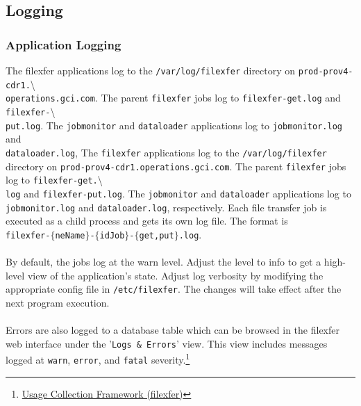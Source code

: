 \documentclass[12pt,letterpaper,dvips]{article}
\begin{document}
\subsection{Logging}


\subsubsection{Application Logging}
The filexfer applications log to the \texttt{/var/log/filexfer}
directory on \texttt{prod-prov4-cdr1.}\textbackslash\\
\texttt{operations.gci.com}. The parent \texttt{filexfer} jobs
log to \texttt{filexfer-get.log} and
\texttt{filexfer-}\textbackslash\\
\texttt{put.log}.
The \texttt{jobmonitor} and \texttt{dataloader} applications
log to \texttt{jobmonitor.log} and\\
\texttt{dataloader.log}, The \texttt{filexfer} applications
log to the \texttt{/var/log/filexfer} directory on
\texttt{prod-prov4-cdr1.operations.gci.com}. The parent
\texttt{filexfer} jobs
log to \texttt{filexfer-get.}\textbackslash\\
\texttt{log} and \texttt{filexfer-put.log}. The
\texttt{jobmonitor} and \texttt{dataloader} applications log to\\
\texttt{jobmonitor.log} and \texttt{dataloader.log}, respectively. Each file
transfer job is executed as a child process and gets its own log file. The
format is\\
\texttt{filexfer-}$\{$\texttt{neName}$\}$\texttt{-}$\{$\texttt{idJob}$\}$\texttt{-}$\{$\texttt{get,put}$\}$\texttt{.log}.\\
\\
By default, the jobs log at the warn level.  Adjust the level to info to get a
high-level view of the application's state.  Adjust log verbosity by modifying
the appropriate config file in \texttt{/etc/filexfer}.  The changes will take
effect after the next program execution.\\
\\
Errors are also logged to a database table which can be browsed in the
filexfer web interface under the '\texttt{Logs \& Errors}' view.  This view
includes messages logged at \texttt{warn}, \texttt{error}, and \texttt{fatal}
severity.\footnote{\href{http://oss-wiki.operations.gci.com/dev/index.php/Usage_Collection\_Framework\_(filexfer)}{Usage Collection Framework (filexfer)}}
\end{document}
